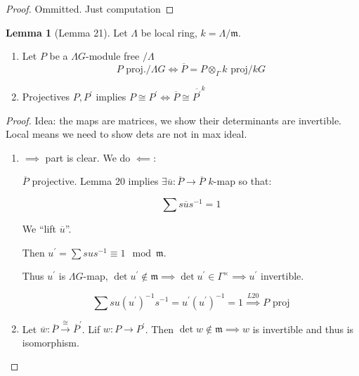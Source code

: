 \documentclass{article}
\theoremstyle{definition}
\newtheorem{lemma}[theorem]{Lemma}
\begin{document}
\begin{proof}
    Ommitted. Just computation
\end{proof}

\begin{lemma}
    [Lemma 21] Let \(\Lambda\) be local ring, \(k = \Lambda / \mathfrak{m}\).

    \begin{enumerate}[label=\alph*)]
        \item Let \(P\) be a \(\Lambda G\)-module free \(/ \Lambda\)
        \[
            P \text{ proj.} / \Lambda G \iff \overline{P} = P \otimes_\Gamma k \text{ proj}/kG 
        \]
        \item Projectives \(P, P^{\prime}\) implies \(P \cong P^{\prime} \iff \overline{P} \cong \overline{P^{\prime}}^k \) 
    \end{enumerate} 
\end{lemma}

\begin{proof}

    Idea: the maps are matrices, we show their determinants are invertible. Local means we need to show dets are not in max ideal.

    \begin{enumerate}[label=\alph*)]
        \item \(\implies\) part is clear. We do \(\impliedby:\)
        
        \(\overline{P}\) projective. Lemma 20 implies \(\exists \overline{u}: \overline{P} \to \overline{P}\) \(k\)-map so that:
        
        \[
            \sum s \overline{u} s ^{-1} = 1 
        \]

        We ``lift \(\overline{u}\)''.

        \begin{center}
        \end{center}

        Then \(u^{\prime} = \sum s u s ^{-1} \equiv 1 \mod \mathfrak{m}\).
        
        Thus \(u^{\prime}\) is \(\Lambda G\)-map, \(\det u^{\prime} \notin \mathfrak{m} \implies \det u^{\prime} \in \Gamma ^\times \implies u^{\prime}\) invertible.

        \[
            \sum s u (u^{\prime})^{-1} s ^{-1} = u^{\prime} (u^{\prime})^{-1} = 1 \overset{L20}{\implies} P \text{ proj}
        \]

        \item Let \(\overline{w}: \overline{P} \overset{\cong}{\to} \overline{P}^{\prime}\). Lif \(w: P \to P^{\prime}\). Then \(\det w\notin \mathfrak{m} \implies w\) is invertible and thus is isomorphism. 

    \end{enumerate} 
\end{proof}
\end{document}
